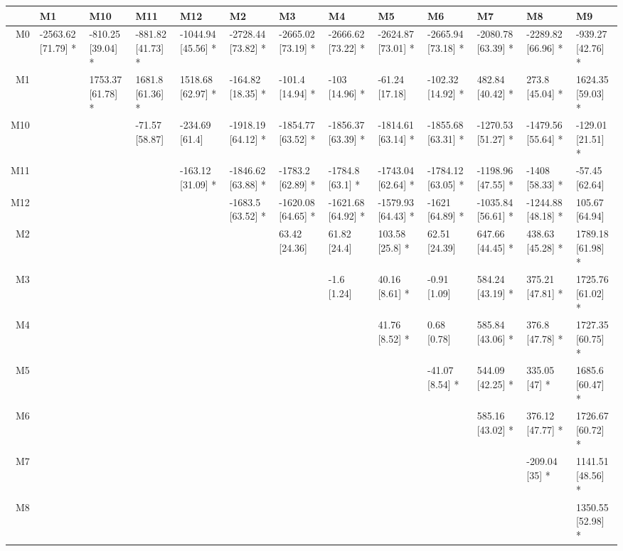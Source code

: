 \begin{table}[ht]
\centering
\begin{tabular}{rllllllllllll}
  \hline
 & M1 & M10 & M11 & M12 & M2 & M3 & M4 & M5 & M6 & M7 & M8 & M9 \\ 
  \hline
M0 & -2563.62 [71.79] * & -810.25 [39.04] * & -881.82 [41.73] * & -1044.94 [45.56] * & -2728.44 [73.82] * & -2665.02 [73.19] * & -2666.62 [73.22] * & -2624.87 [73.01] * & -2665.94 [73.18] * & -2080.78 [63.39] * & -2289.82 [66.96] * & -939.27 [42.76] * \\ 
  M1 &  & 1753.37 [61.78] * & 1681.8 [61.36] * & 1518.68 [62.97] * & -164.82 [18.35] * & -101.4 [14.94] * & -103 [14.96] * & -61.24 [17.18] & -102.32 [14.92] * & 482.84 [40.42] * & 273.8 [45.04] * & 1624.35 [59.03] * \\ 
  M10 &  &  & -71.57 [58.87] & -234.69 [61.4] & -1918.19 [64.12] * & -1854.77 [63.52] * & -1856.37 [63.39] * & -1814.61 [63.14] * & -1855.68 [63.31] * & -1270.53 [51.27] * & -1479.56 [55.64] * & -129.01 [21.51] * \\ 
  M11 &  &  &  & -163.12 [31.09] * & -1846.62 [63.88] * & -1783.2 [62.89] * & -1784.8 [63.1] * & -1743.04 [62.64] * & -1784.12 [63.05] * & -1198.96 [47.55] * & -1408 [58.33] * & -57.45 [62.64] \\ 
  M12 &  &  &  &  & -1683.5 [63.52] * & -1620.08 [64.65] * & -1621.68 [64.92] * & -1579.93 [64.43] * & -1621 [64.89] * & -1035.84 [56.61] * & -1244.88 [48.18] * & 105.67 [64.94] \\ 
  M2 &  &  &  &  &  & 63.42 [24.36] & 61.82 [24.4] & 103.58 [25.8] * & 62.51 [24.39] & 647.66 [44.45] * & 438.63 [45.28] * & 1789.18 [61.98] * \\ 
  M3 &  &  &  &  &  &  & -1.6 [1.24] & 40.16 [8.61] * & -0.91 [1.09] & 584.24 [43.19] * & 375.21 [47.81] * & 1725.76 [61.02] * \\ 
  M4 &  &  &  &  &  &  &  & 41.76 [8.52] * & 0.68 [0.78] & 585.84 [43.06] * & 376.8 [47.78] * & 1727.35 [60.75] * \\ 
  M5 &  &  &  &  &  &  &  &  & -41.07 [8.54] * & 544.09 [42.25] * & 335.05 [47] * & 1685.6 [60.47] * \\ 
  M6 &  &  &  &  &  &  &  &  &  & 585.16 [43.02] * & 376.12 [47.77] * & 1726.67 [60.72] * \\ 
  M7 &  &  &  &  &  &  &  &  &  &  & -209.04 [35] * & 1141.51 [48.56] * \\ 
  M8 &  &  &  &  &  &  &  &  &  &  &  & 1350.55 [52.98] * \\ 
   \hline
\end{tabular}
\end{table}
